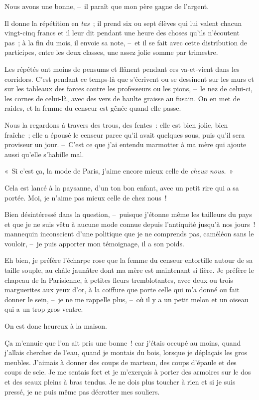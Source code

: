 \documentclass[french,twoside]{book} %
\begin{document}
\noindent Nous avons une bonne, – il paraît que mon père gagne de l’argent.\par
Il donne la répétition en\emph{ tas} ; il prend six ou sept élèves qui lui valent chacun vingt-cinq francs et il leur dit pendant une heure des choses qu’ils n’écoutent pas ; à la fin du mois, il envoie sa note, – et il se fait avec cette distribution de participes, entre les deux classes, une assez jolie somme par trimestre.\par
Les répétés ont moins de pensums et flânent pendant ces va-et-vient dans les corridors. C’est pendant ce temps-là que s’écrivent ou se dessinent sur les murs et sur les tableaux des farces contre les professeurs ou les pions, – le nez de celui-ci, les cornes de celui-là, avec des vers de haulte graisse au fusain. On en met de raides, et la femme du censeur est gênée quand elle passe.\par
Nous la regardons à travers des trous, des fentes : elle est bien jolie, bien fraîche ; elle a épousé le censeur parce qu’il avait quelques sous, puis qu’il sera proviseur un jour. – C’est ce que j’ai entendu marmotter à ma mère qui ajoute aussi qu’elle s’habille mal.\par
« Si c’est ça, la mode de Paris, j’aime encore mieux celle de \emph{cheux nous.} »\par
Cela est lancé à la paysanne, d’un ton bon enfant, avec un petit rire qui a sa portée. Moi, je n’aime pas mieux celle de chez nous !\par
Bien désintéressé dans la question, – puisque j’étonne même les tailleurs du pays et que je ne suis vêtu à aucune mode connue depuis l’antiquité jusqu’à nos jours ! mannequin inconscient d’une politique que je ne comprends pas, caméléon sans le vouloir, – je puis apporter mon témoignage, il a son poids.\par
Eh bien, je préfère l’écharpe rose que la femme du censeur entortille autour de sa taille souple, au châle jaunâtre dont ma mère est maintenant si fière. Je préfère le chapeau de la Parisienne, à petites fleurs tremblotantes, avec deux ou trois marguerites aux yeux d’or, à la coiffure que porte celle qui m’a donné ou fait donner le sein, – je ne me rappelle plus, – où il y a un petit melon et un oiseau qui a un trop gros ventre.\par
\bigbreak
\noindent On est donc heureux à la maison.\par
Ça m’ennuie que l’on ait pris une bonne ! car j’étais occupé au moins, quand j’allais chercher de l’eau, quand je montais du bois, lorsque je déplaçais les gros meubles. J’aimais à donner des coups de marteau, des coups d’épaule et des coups de scie. Je me sentais fort et je m’exerçais à porter des armoires sur le dos et des seaux pleins à bras tendus. Je ne dois plus toucher à rien et si je suis pressé, je ne puis même pas décrotter mes souliers.\par
\end{document}
